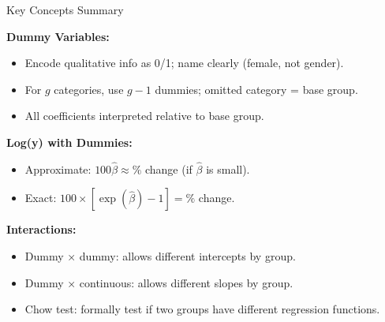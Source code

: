 \documentclass[aspectratio=169, 12pt]{beamer}
\begin{document}
\begin{frame}[shrink=25]{Key Concepts Summary}

  \begin{keybox}
    \textbf{Dummy Variables:}
    \begin{itemize}
      \item Encode qualitative info as 0/1; name clearly (female, not gender).
      \item For $g$ categories, use $g-1$ dummies; omitted category = base group.
      \item All coefficients interpreted relative to base group.
    \end{itemize}
  \end{keybox}

  \medskip

  \begin{highlightbox}
    \textbf{Log(y) with Dummies:}
    \begin{itemize}
      \item Approximate: $100 \hat{\beta} \approx \%$ change (if $\hat{\beta}$ is small).
      \item Exact: $100 \times [\exp(\hat{\beta}) - 1] = \%$ change.
    \end{itemize}
  \end{highlightbox}

  \medskip

  \begin{keybox}
    \textbf{Interactions:}
    \begin{itemize}
      \item Dummy × dummy: allows different intercepts by group.
      \item Dummy × continuous: allows different slopes by group.
      \item Chow test: formally test if two groups have different regression functions.
    \end{itemize}
  \end{keybox}

\end{frame}
\end{document}
